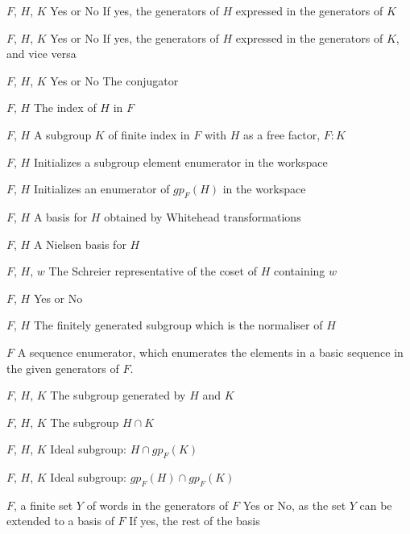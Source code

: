 \begin{enumerate}

{$F$, $H$, $K$}
{Yes or No}
{If yes, the generators of $H$ expressed in the generators of $K$}

{$F$, $H$, $K$}
{Yes or No}
{If yes, the generators of $H$ expressed in the generators of $K$, and vice
versa
}

{$F$, $H$, $K$}
{Yes or No}
{The conjugator}

{$F$, $H$}
{The index of $H$ in $F$}

{$F$, $H$}
{A subgroup $K$ of finite index in $F$ with $H$ as a free factor, $F:K$}

{$F$, $H$}
{Initializes a subgroup element enumerator in the workspace}

{$F$, $H$}
{Initializes an enumerator of $gp_F(H)$ in the workspace}

{$F$, $H$}
{A basis for $H$ obtained by Whitehead transformations}

{$F$, $H$}
{A Nielsen basis for $H$}

{$F$, $H$, $w$}
{The Schreier representative of the coset of $H$ containing $w$}

{$F$, $H$}
{Yes or No}

{$F$, $H$}
{The finitely generated subgroup which is the normaliser of $H$}

{$F$}
{A sequence enumerator, which enumerates the
elements in a basic sequence in the given generators of $F$.
}

{$F$, $H$, $K$}
{The subgroup generated by $H$ and $K$}

{$F$, $H$, $K$}
{The subgroup $H\cap K$}

{$F$, $H$, $K$}
{Ideal subgroup: $H\cap gp_F(K)$}

{$F$, $H$, $K$}
{Ideal subgroup: $gp_F(H)\cap gp_F(K)$}

{$F$, a finite set $Y$ of words in the generators of $F$}
{Yes or No, as the set $Y$ can be extended to a basis of $F$}
{If yes, the rest of the basis}


\end{enumerate}
